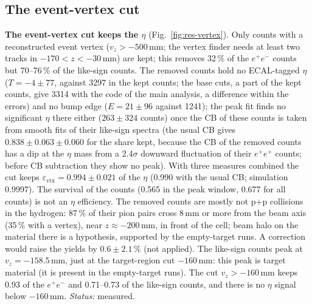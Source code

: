 \documentclass[11pt,a4paper]{article}
\newcommand{\ee}{\ensuremath{e^{+}e^{-}}\xspace}
\newcommand{\vz}{\ensuremath{v_z}\xspace}
\begin{document}
\subsection{The event-vertex cut}
\label{sec:vertex}
\textbf{The event-vertex cut keeps the $\eta$} (Fig.~\ref{fig:res-vertex}). Only counts with a reconstructed event vertex
($\vz>-500$\,mm; the vertex finder needs at least two tracks in $-170<z<-30$\,mm) are kept; this removes 32\,\% of the \ee counts but
70--76\,\% of the like-sign counts. The removed counts hold no ECAL-tagged $\eta$ ($T=-4\pm77$, against 3297 in the kept counts;
the base cuts, a part of the kept counts, give 3314 with the code of the main analysis, a difference within the errors) and no bump edge ($E=21\pm96$ against 1241); the peak fit finds no significant $\eta$ there either ($263\pm324$ counts) once the CB of these counts is taken from smooth fits of their like-sign
spectra (the usual CB gives $0.838\pm0.063\pm0.060$ for the share kept, because the CB of the removed counts has a dip at the $\eta$ mass
from a 2.4$\sigma$ downward fluctuation of their $e^+e^+$ counts; before CB subtraction they show no peak). With three measures
combined the cut keeps $\varepsilon_{\mathrm{vtx}}=0.994\pm0.021$ of the $\eta$ (0.990 with the usual CB; simulation 0.9997). The survival of the counts (0.565 in
the peak window, 0.677 for all counts) is not an $\eta$ efficiency. The removed counts are mostly not p+p collisions in the hydrogen:
87\,\% of their pion pairs cross 8\,mm or more from the beam axis (35\,\% with a vertex), near $z\approx-200$\,mm, in front of the cell;
beam halo on the material there is a hypothesis, supported by the empty-target runs. A correction would raise the yields by
$0.6\pm2.1$\,\% (not applied). The like-sign counts peak at $\vz=-158.5$\,mm, just at the target-region cut $-160$\,mm: this peak is target
material (it is present in the empty-target runs). The cut $\vz>-160$\,mm keeps 0.93 of the \ee and 0.71--0.73 of the like-sign counts,
and there is no $\eta$ signal below $-160$\,mm. \emph{Status:} measured.

\end{document}
